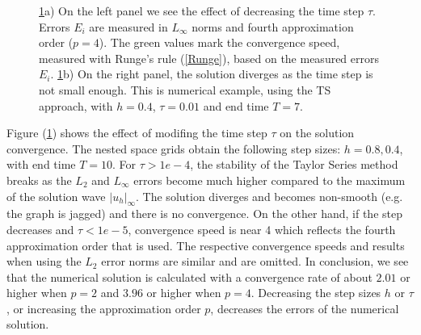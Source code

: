 \documentclass[%
 aip,
cp,  
 amsmath,amssymb,
 reprint,
]{iopconfser}
\newcommand{\rf}[1]{(\ref{#1})}
\begin{document}
\begin{figure}
	\caption{\ref{figConvSeq}a) On the left panel we see the effect of decreasing the time step $\tau$. Errors $E_i$ are measured in $L_\infty$ norms and fourth approximation order ($p=4$). The green values mark the convergence speed, measured with Runge's rule \rf{Runge}, based on the measured errors $E_i$. 
\ref{figConvSeq}b) On the right panel, the solution diverges as the time step is not small enough. This is numerical example, using the TS approach, with $h=0.4$, $\tau = 0.01$ and end time $T=7$.}
	\label{figConvSeq}
\end{figure}

Figure \rf{figConvSeq} shows the effect of modifing the time step $\tau$ on the solution convergence. The nested space grids obtain the following step sizes: $h=0.8, 0.4$, with end time $T=10$. For $\tau>1e-4$, the stability of the Taylor Series method breaks as the $L_2$ and $L_\infty$ errors become much higher compared to the maximum of the solution wave $|u_h|_\infty$. The solution diverges and becomes non-smooth (e.g. the graph is jagged) and there is no convergence. On the other hand, if the step decreases and $\tau<1e-5$, convergence speed is near 4 which reflects the fourth approximation order that is used. The respective convergence speeds and results when using the $L_2$ error norms are similar and are omitted.
In conclusion, we see that the numerical solution is calculated with a convergence rate of about $2.01$ or higher when $p=2$ and $3.96$ or higher when $p=4$. Decreasing the step sizes $h$ or $\tau$, or increasing the approximation order $p$, decreases the errors of the numerical solution.
\end{document}
